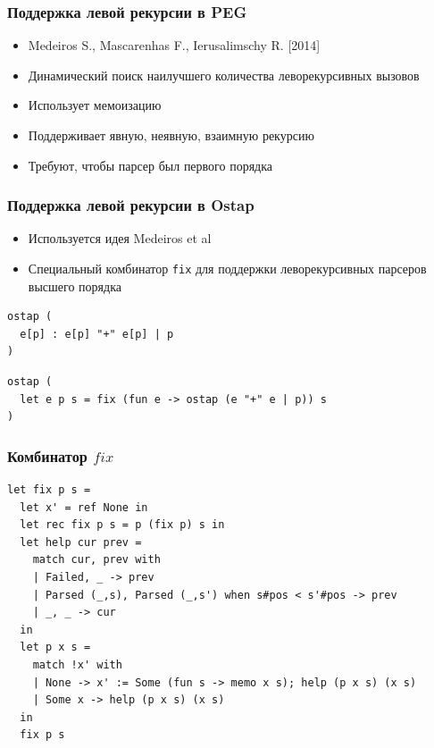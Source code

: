 \documentclass{beamer}
\begin{document}


\begin{frame}
  \transwipe[direction=90]
  \frametitle{Поддержка левой рекурсии в PEG}
  \begin{itemize}
    \item Medeiros S., Mascarenhas F., Ierusalimschy R. [2014] %
    \item Динамический поиск наилучшего количества леворекурсивных вызовов
    \item Использует мемоизацию
    \item Поддерживает явную, неявную, взаимную рекурсию
    \item Требуют, чтобы парсер был первого порядка
  \end{itemize}
\end{frame}

\begin{frame}[fragile]
  \transwipe[direction=90]
  \frametitle{Поддержка левой рекурсии в Ostap}
  \begin{itemize} 
    \item Используется идея Medeiros et al
    \item Специальный комбинатор \verb!fix! для поддержки леворекурсивных парсеров высшего порядка
  \end{itemize}
\begin{lstlisting}[frame=single]  
ostap (
  e[p] : e[p] "+" e[p] | p
)
\end{lstlisting}

\begin{lstlisting}[frame=single]  
ostap (
  let e p s = fix (fun e -> ostap (e "+" e | p)) s
)
\end{lstlisting}
\end{frame}


\begin{frame}[fragile]
  \transwipe[direction=90]
  \frametitle{Комбинатор $fix$}

\begin{lstlisting}[frame=single]  
let fix p s = 
  let x' = ref None in  
  let rec fix p s = p (fix p) s in
  let help cur prev =
    match cur, prev with 
    | Failed, _ -> prev
    | Parsed (_,s), Parsed (_,s') when s#pos < s'#pos -> prev
    | _, _ -> cur
  in
  let p x s = 
    match !x' with
    | None -> x' := Some (fun s -> memo x s); help (p x s) (x s)
    | Some x -> help (p x s) (x s)
  in
  fix p s
\end{lstlisting}
\end{frame}
\end{document}

